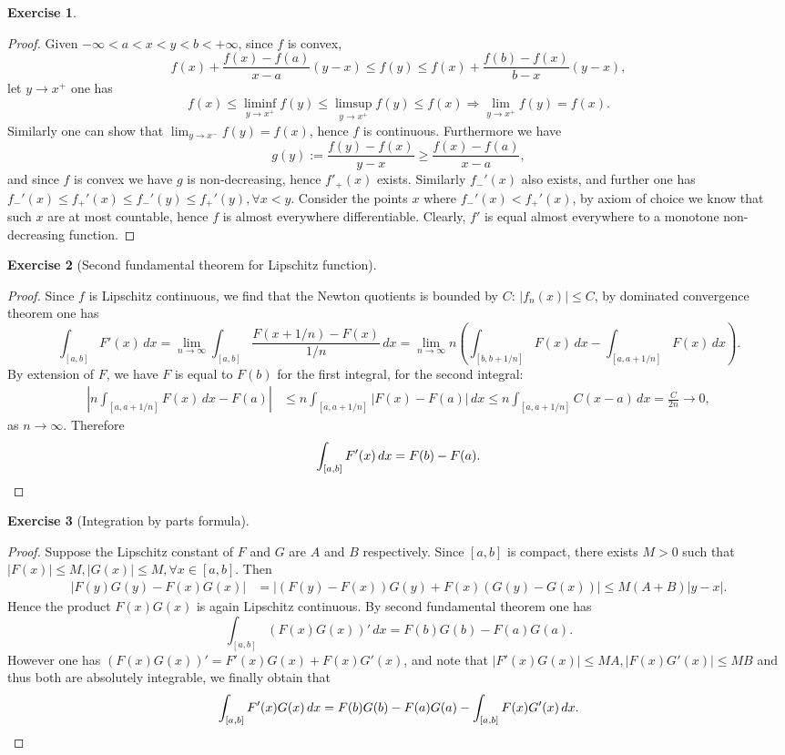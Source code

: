 \documentclass[a4paper]{article}
\newtheorem{ex}{Exercise}[subsection]
\begin{document}
\begin{ex}\end{ex}\begin{proof}
Given $-\infty < a < x < y < b < +\infty$, since $f$ is convex,$$
f(x) + \frac{f(x) - f(a)}{x - a}(y - x) \leq f(y) \leq f(x) + \frac{f(b) - f(x)}{b - x}(y - x),
$$let $y \to x^+$ one has $$
f(x) \leq \liminf_{y \to x^+} f(y) \leq \limsup_{y \to x^+} f(y) \leq f(x) \Rightarrow \lim_{y \to x^+}f(y) = f(x).
$$Similarly one can show that $\lim_{y \to x^-} f(y) = f(x)$, hence $f$ is continuous. Furthermore we have $$
g(y) := \frac{f(y) - f(x)}{y - x} \geq \frac{f(x) - f(a)}{x - a},
$$and since $f$ is convex we have $g$ is non-decreasing, hence $f'_+(x)$ exists. Similarly $f_-'(x)$ also exists,
and further one has $f_-'(x) \leq f_+'(x) \leq f_-'(y) \leq f_+'(y), \forall x < y$. Consider the points $x$ where
$f_-'(x) < f_+'(x)$, by axiom of choice we know that such $x$ are at most countable, hence $f$ is almost everywhere 
differentiable. Clearly, $f'$ is equal almost everywhere to a monotone non-decreasing function.
\end{proof}

\begin{ex}[Second fundamental theorem for Lipschitz function]\end{ex}\begin{proof}
Since $f$ is Lipschitz continuous, we find that the Newton quotients is bounded by $C$: $|f_n(x)| \leq C$, by 
dominated convergence theorem one has$$
\int_{[a, b]} F'(x)\,dx = \lim_{n \to \infty}\int_{[a, b]} \frac{F(x + 1/n) - F(x)}{1/n}\,dx = 
\lim_{n\to\infty} n\left(\int_{[b, b + 1/n]} F(x)\,dx - \int_{[a, a + 1/n]}F(x)\,dx\right).
$$
By extension of $F$, we have $F$ is equal to $F(b)$ for the first integral, for the second integral:\begin{align*}
|n\int_{[a, a + 1/n]} F(x)\,dx - F(a)| &\leq n\int_{[a, a + 1/n]}|F(x) - F(a)|\,dx \leq n\int_{[a, a+1/n]}C(x - a)\,dx
= \frac{C}{2n} \to 0,
\end{align*}as $n\to\infty$. Therefore\[
\int_{[a, b]}F'(x)\,dx = F(b) - F(a).\qedhere
\]
\end{proof}

\begin{ex}[Integration by parts formula]\end{ex}\begin{proof}
Suppose the Lipschitz constant of $F$ and $G$ are $A$ and $B$ respectively. Since $[a, b]$ is compact, there exists
$M > 0$ such that $|F(x)| \leq M, |G(x)| \leq M, \forall x \in [a, b]$. Then \begin{align*}
|F(y)G(y) - F(x)G(x)| &= |(F(y) - F(x))G(y) + F(x)(G(y) - G(x))| \leq M(A + B)|y - x|.
\end{align*}
Hence the product $F(x)G(x)$ is again Lipschitz continuous. By second fundamental theorem one has $$
\int_{[a, b]}(F(x)G(x))'\,dx = F(b)G(b) - F(a)G(a).
$$However one has $(F(x)G(x))' = F'(x)G(x) + F(x)G'(x)$, and note that $|F'(x)G(x)|\leq MA, |F(x)G'(x)| \leq MB$
and thus both are absolutely integrable, we finally obtain that \[
\int_{[a, b]}F'(x)G(x)\,dx = F(b)G(b) - F(a)G(a) - \int_{[a, b]}F(x)G'(x)\,dx.\qedhere
\]
\end{proof}
\end{document}
